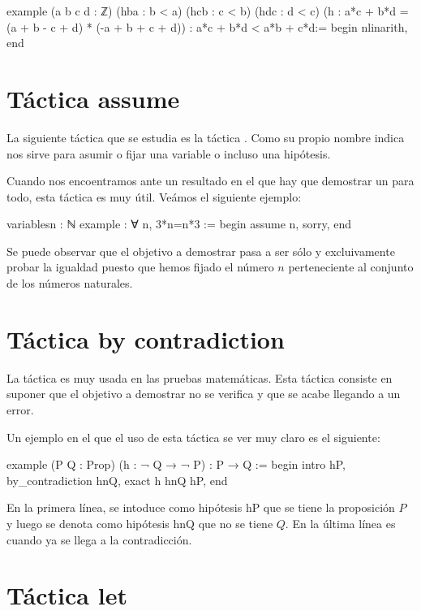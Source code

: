 \begin{leancode}
example (a b c d : ℤ)
  (hba : b < a)
  (hcb : c < b)
  (hdc : d < c)
  (h : a*c + b*d = (a + b - c + d) * (-a + b + c + d))
  : a*c + b*d < a*b + c*d:=
begin
  nlinarith,
end
\end{leancode}

\section{Táctica assume}
La siguiente táctica que se estudia es la táctica . Como
su propio nombre indica nos sirve para asumir o fijar una variable o incluso una
hipótesis.

Cuando nos encoentramos ante un resultado en el que hay que demostrar un para
todo, esta táctica es muy útil. Veámos el siguiente ejemplo:

\begin{leancode}
variables{n : ℕ}
example : ∀ n, 3*n=n*3 :=
begin
  assume n,
  sorry,
end
\end{leancode}

Se puede observar que el objetivo a demostrar pasa a ser sólo y excluivamente
probar la igualdad puesto que hemos fijado el número \(n\) perteneciente al
conjunto de los números naturales.


\section{Táctica by contradiction}
La táctica  es muy
usada en las pruebas matemáticas. Esta táctica consiste en suponer que el
objetivo a demostrar no se verifica y que se acabe llegando a  un error.

Un ejemplo en el que el uso de esta táctica se ver muy claro es el siguiente:

\begin{leancode}
example (P Q : Prop) (h : ¬ Q → ¬ P) : P → Q :=
begin
  intro hP,
  by_contradiction hnQ,
  exact h hnQ hP,
end
\end{leancode}

En la primera línea, se intoduce como hipótesis hP que se tiene la proposición
\(P\) y luego se denota como hipótesis hnQ que no se tiene \(Q\). En la última
línea es cuando ya se llega a la contradicción.

\section{Táctica let}

